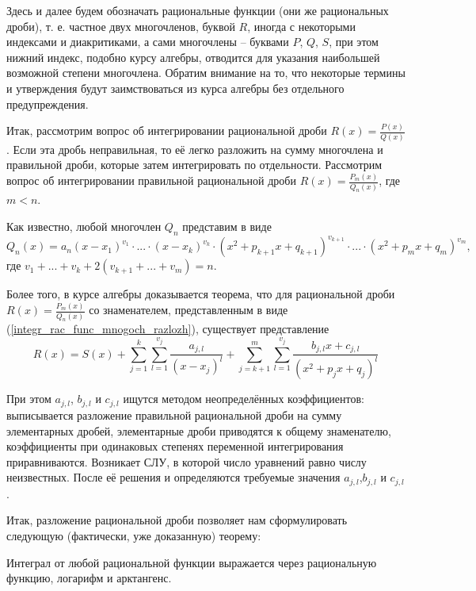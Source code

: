 Здесь и далее будем обозначать рациональные функции (они же рациональных дроби), т. е. частное двух многочленов, буквой $R$, иногда с некоторыми индексами и диакритиками, а сами многочлены -- буквами $P$, $Q$, $S$, при этом нижний индекс, подобно курсу алгебры, отводится для указания наибольшей возможной степени многочлена. Обратим внимание на то, что некоторые термины и утверждения будут заимствоваться из курса алгебры без отдельного предупреждения.

Итак, рассмотрим вопрос об интегрировании рациональной дроби $R(x)=\frac{P(x)}{Q(x)}$.
Если эта дробь неправильная, то её легко разложить на сумму многочлена и правильной дроби, которые затем интегрировать по отдельности.
Рассмотрим вопрос об интегрировании правильной рациональной дроби ${ R(x)=\frac{P_m(x)}{Q_n(x)} }$, где $m<n$.

Как известно, любой многочлен $Q_n$ представим в виде
\begin{equation}\label{integr_rac_func_mnogoch_razlozh}
Q_n(x)=a_n(x-x_1)^{v_1}\cdot...\cdot(x-x_k)^{v_k}\cdot(x^2+p_{k+1}x+q_{k+1})^{v_{k+1}}\cdot...\cdot(x^2+p_m x+q_m)^{v_m}
,\end{equation}
где $v_1+...+v_k + 2(v_{k+1}+...+v_m)=n$.

Более того, в курсе алгебры доказывается теорема, что для рациональной дроби $R(x)=\frac{P_m(x)}{Q_n(x)}$ со знаменателем, представленным в виде (\ref{integr_rac_func_mnogoch_razlozh}), существует представление
$$
R(x)=S(x)+\sum_{j=1}^k\sum_{l=1}^{v_j}\frac{a_{j,l}}{(x-x_j)^l}+\sum_{j=k+1}^m\sum_{l=1}^{v_j}\frac{b_{j,l}x+c_{j,l}}{(x^2+p_j x + q_j)^l}
$$

При этом $a_{j,l}$, $b_{j,l}$ и $c_{j,l}$ ищутся методом неопределённых коэффициентов: выписывается разложение правильной рациональной дроби на сумму элементарных дробей, элементарные дроби приводятся к общему знаменателю, коэффициенты при одинаковых степенях переменной интегрирования приравниваются. Возникает СЛУ, в которой число уравнений равно числу неизвестных. После её решения и определяются требуемые значения $a_{j,l}$,$b_{j,l}$ и $c_{j,l}$.

Итак, разложение рациональной дроби позволяет нам сформулировать следующую (фактически, уже доказанную) теорему:

\begin{teorema}
Интеграл от любой рациональной функции выражается через рациональную функцию, логарифм и арктангенс.
\end{teorema}
